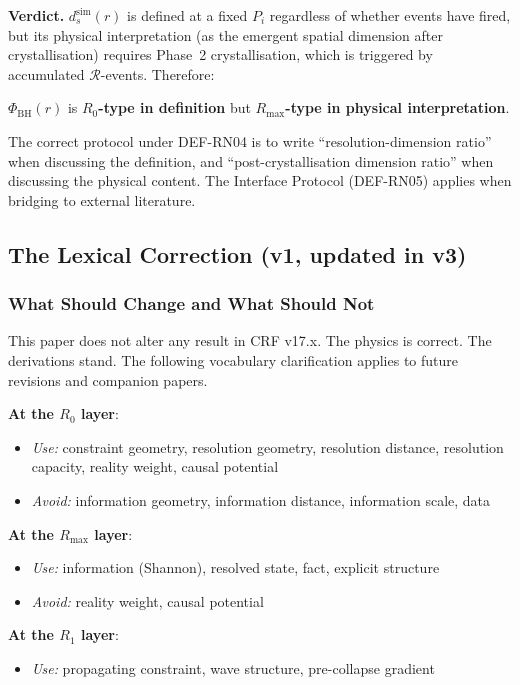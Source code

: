 \documentclass[12pt, a4paper]{article}
\begin{document}
\textbf{Verdict.} $d_s^{\mathrm{sim}}(r)$ is defined at a fixed
$P_i$ regardless of whether events have fired, but its physical
interpretation (as the emergent spatial dimension after
crystallisation) requires Phase~2 crystallisation, which is
triggered by accumulated $\mathcal{R}$-events. Therefore:
\begin{center}
$\Phi_{\mathrm{BH}}(r)$ is \textbf{$R_0$-type in definition}
but \textbf{$R_{\max}$-type in physical interpretation}.
\end{center}
The correct protocol under DEF-RN04 is to write
``resolution-dimension ratio'' when discussing the definition,
and ``post-crystallisation dimension ratio'' when discussing the
physical content. The Interface Protocol (DEF-RN05) applies when
bridging to external literature.

\subsection{The Lexical Correction (v1, updated in v3)}

\subsubsection{What Should Change and What Should Not}

This paper does not alter any result in CRF v17.x. The physics
is correct. The derivations stand. The following vocabulary
clarification applies to future revisions and companion papers.

\begin{formalbox}[title={DEF-RN04: Canonical vocabulary
by Resolution layer}]
\textbf{At the $R_0$ layer}:
\begin{itemize}[leftmargin=*,noitemsep]
\item \emph{Use:} constraint geometry, resolution geometry,
resolution distance, resolution capacity, reality weight,
causal potential
\item \emph{Avoid:} information geometry, information distance,
information scale, data
\end{itemize}

\textbf{At the $R_{\max}$ layer}:
\begin{itemize}[leftmargin=*,noitemsep]
\item \emph{Use:} information (Shannon), resolved state, fact,
explicit structure
\item \emph{Avoid:} reality weight, causal potential
\end{itemize}

\textbf{At the $R_1$ layer}:
\begin{itemize}[leftmargin=*,noitemsep]
\item \emph{Use:} propagating constraint, wave structure,
pre-collapse gradient
\end{itemize}
\end{formalbox}
\end{document}
